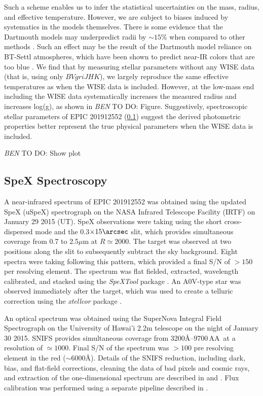 \documentclass{emulateapj}
\newcommand{\logg}{{log(g)}}
\newcommand{\todo}[3]{{\color{#2} \emph{#1} TO DO: #3}}
\newcommand{\btmtodo}[1]{\todo{BEN}{red}{#1}}
\begin{document}
Such a scheme enables us to infer the statistical uncertainties on the
mass, radius, and effective temperature.
However, we are subject to biases induced by systematics in the models themselves.
There is some evidence that the Dartmouth models may underpredict
radii by $\sim 15\%$ when compared to other methods \citep{Newton15,
Montet15}.
Such an effect may be the result of the Dartmouth model reliance on BT-Settl
atmospheres, which have been shown to predict near-IR colors that are too blue
\citep{Thompson14}.
We find that by measuring stellar parameters without any WISE data (that is, using
only $BVgriJHK$), we largely reproduce the same effective temperatures as when
the WISE data is included.
However, at the low-mass end including the WISE data systematically increases the
measured radius and increases \logg, as shown in \btmtodo{Figure}.
Suggestively, spectroscopic stellar parameters of EPIC 201912552
(\textsection\ref{Spexobs}) suggest the derived photometric properties better
represent the true physical parameters when the WISE data is included.


\btmtodo{Show plot}



\subsection{SpeX Spectroscopy}
\label{Spexobs}


A near-infrared spectrum of EPIC 201912552 was obtained using the updated SpeX
(uSpeX) spectrograph \citep{Rayner03} on the NASA Infrared Telescope Facility
(IRTF) on January 29 2015 (UT).
SpeX observations were taking using the short cross-dispersed mode and the
0.3$\times15\arcsec$ slit, which provides simultaneous coverage from 0.7
to 2.5$\mu$m at $R\simeq2000$.
The target was observed at two positions along the slit to subsequently subtract
the sky background. Eight spectra were taking following this pattern, which provided
a final S/N of $>150$ per resolving element.
The spectrum was flat fielded, extracted, wavelength calibrated, and stacked
using the \textit{SpeXTool} package \citep{Cushing04}.
An A0V-type star was observed immediately after
the target, which was used to create a telluric correction using the
\textit{xtellcor} package \citep{Vacca03}.

An optical spectrum was obtained using the SuperNova Integral Field Spectrograph
\citep[SNIFS,][]{Aldering02,Lantz04} on the University of Hawai'i
2.2m telescope on the night of January 30 2015.
SNIFS provides simultaneous coverage from 3200\AA--9700\,AA\ at a resolution
of $\simeq1000$. Final S/N of the spectrum was $>100$ pre resolving element
in the red ($\sim6000$\AA).
Details of the SNIFS reduction, including dark, bias, and flat-field corrections,
cleaning the data of bad pixels and cosmic rays, and extraction of the
one-dimensional spectrum are described in \citet{Bacon01} and
\citet{Aldering06}.
Flux calibration was performed using a separate pipeline described in \citet{Mann15}.
\end{document}
